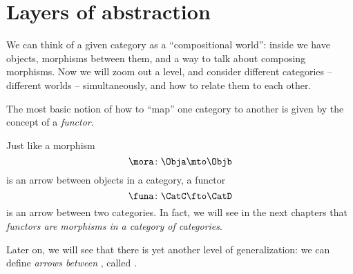 
\section{Layers of abstraction}
\label{sec:functors-intro}


We can think of a given category \CatC as a ``compositional world'': inside \CatC we have objects, morphisms between them, and a way to talk about composing morphisms.
Now we will zoom out a level, and consider different categories -- different worlds -- simultaneously, and how to relate them to each other.

The most basic notion of how to ``map'' one category to another is given by the concept of a \emph{functor}.

Just like a morphism
%
\begin{equation}
    \mora \colon \Obja \mto \Objb
\end{equation}
%
is an arrow between objects in a category, a functor
%
\begin{equation}
    \funa \colon \CatC \fto \CatD
\end{equation}
%
is an arrow between two categories.
In fact, we will see in the next chapters that \emph{functors are morphisms in a category of categories}.

Later on, we will see that there is yet another level of generalization: we can define \emph{arrows between }, called .

